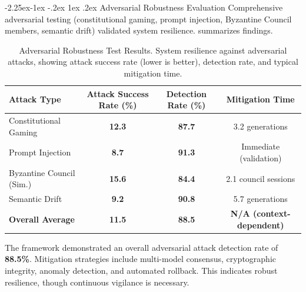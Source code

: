 \documentclass[manuscript,screen,9pt]{acmart}
\makeatletter
\renewcommand\subsection{\@startsection{subsection}{2}{\z@}%
  {-2.25ex\@plus -1ex \@minus -.2ex}%
  {1ex \@plus .2ex}%
  {\normalfont\large\bfseries}}
\newcommand{\tablesize}{\footnotesize}
\newcommand{\tablenumfmt}[1]{\textbf{#1}}
\makeatother
\begin{document}
\subsection{Adversarial Robustness Evaluation}
\label{subsec:adversarial_robustness_discussion}
Comprehensive adversarial testing (constitutional gaming, prompt injection, Byzantine Council members, semantic drift) validated system resilience.  summarizes findings.
\begin{table}[htbp]
\centering
\caption{Adversarial Robustness Test Results. System resilience against adversarial attacks, showing attack success rate (lower is better), detection rate, and typical mitigation time.}
\label{tab:adversarial_results}
\tablesize
\begin{tabular}{@{}lccc@{}}
\toprule
\textbf{Attack Type} & \textbf{Attack Success Rate (\%)} & \textbf{Detection Rate (\%)} & \textbf{Mitigation Time} \\
\midrule
Constitutional Gaming & \tablenumfmt{12.3} & \tablenumfmt{87.7} & 3.2 generations \\
Prompt Injection      & \tablenumfmt{8.7}  & \tablenumfmt{91.3} & Immediate (validation) \\
Byzantine Council (Sim.) & \tablenumfmt{15.6} & \tablenumfmt{84.4} & 2.1 council sessions \\
Semantic Drift        & \tablenumfmt{9.2}  & \tablenumfmt{90.8} & 5.7 generations \\
\midrule
\textbf{Overall Average} & \textbf{\tablenumfmt{11.5}} & \textbf{\tablenumfmt{88.5}} & \textbf{N/A (context-dependent)} \\
\bottomrule
\end{tabular}
\end{table}
The framework demonstrated an overall adversarial attack detection rate of \textbf{88.5\%}. Mitigation strategies include multi-model consensus, cryptographic integrity, anomaly detection, and automated rollback. This indicates robust resilience, though continuous vigilance is necessary.
\end{document}
